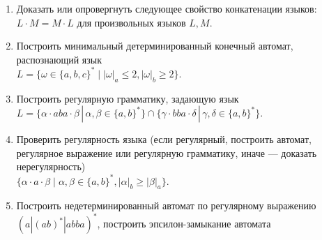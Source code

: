 \documentclass[12pt]{article}
\begin{document}
\begin{enumerate}
  \item Доказать или опровергнуть следующее свойство конкатенации языков: $ L \cdot M = M \cdot L $ для произвольных языков $L, M$.
  \item Построить минимальный детерминированный конечный автомат, распознающий язык  \\ $L = \{\omega \in \{ a, b, c \}^* \mid | \omega |_a \leq 2, | \omega |_b \geq 2 \}$.
  
  \item Построить регулярную грамматику, задающую язык \\ $ L = \{ \alpha \cdot aba \cdot \beta \, | \, \alpha, \beta \in \{ a, b \}^* \} \cap \{ \gamma \cdot bba \cdot \delta \, | \, \gamma, \delta \in \{ a, b \}^* \} $.
  \item Проверить регулярность языка (если регулярный, построить автомат, регулярное выражение или регулярную грамматику, иначе --- доказать нерегулярность) \\ $\{ \alpha \cdot a \cdot \beta \mid \alpha, \beta \in \{ a, b\}^*, |\alpha|_b \geq |\beta|_a \} $.
  \item {Построить недетерминированный автомат по регулярному выражению $ (a | (ab)^* | abba)^* $, построить эпсилон-замыкание автомата }
\end{enumerate}
\end{document}
